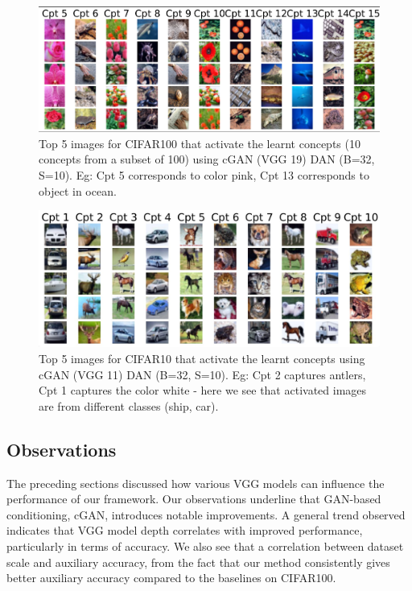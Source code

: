\documentclass[letterpaper]{article}
\begin{document}
\begin{figure}[h!]
    \centering
    \includegraphics[width=1.0\columnwidth]{images/CGAN_19_32_10_1_cifar100.png}
    \caption{Top 5 images for CIFAR100 that activate the learnt concepts (10 concepts from a subset of 100) using cGAN (VGG 19) DAN  (B=32, S=10). Eg: Cpt 5 corresponds to color pink, Cpt 13 corresponds to object in ocean.}
    \label{fig:cgan_19_cifar100}
\end{figure}

\begin{figure}
    \centering
    \includegraphics[width=1.0\columnwidth]{images/cgan11.jpg}
    \caption{Top 5 images for CIFAR10 that activate the learnt concepts using cGAN (VGG 11) DAN  (B=32, S=10). Eg: Cpt 2 captures antlers, Cpt 1 captures the color white - here we see that activated images are from different classes (ship, car).}
    \label{fig:cgan11}
\end{figure}

\subsection{Observations}\label{sec:observations}
The preceding sections discussed how various VGG models can influence the performance of our framework. Our observations underline that GAN-based conditioning, cGAN, introduces notable improvements.
A general trend observed indicates that VGG model depth correlates with improved performance, particularly in terms of accuracy.
We also see that a correlation between dataset scale and auxiliary accuracy, from the fact that our method consistently gives better auxiliary accuracy compared to the baselines on CIFAR100.
\end{document}
